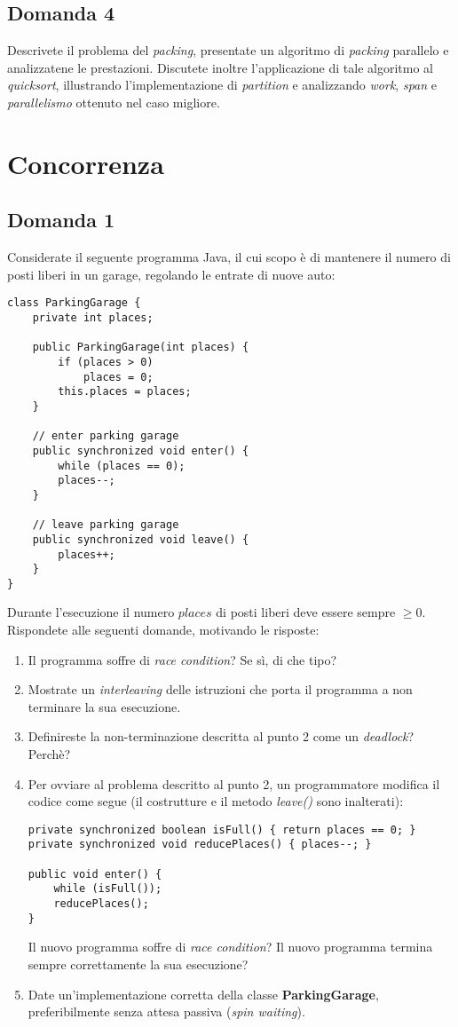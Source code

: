\newpage

\subsection{Domanda 4}
Descrivete il problema del \textit{packing}, presentate un algoritmo di \textit{packing} parallelo e analizzatene le prestazioni. Discutete inoltre l'applicazione di tale algoritmo al \textit{quicksort}, illustrando l'implementazione di \textit{partition} e analizzando \textit{work}, \textit{span} e \textit{parallelismo} ottenuto nel caso migliore.

\newpage

\section{Concorrenza}

\subsection{Domanda 1}
Considerate il seguente programma Java, il cui scopo è di mantenere il numero di posti liberi in un garage, regolando le entrate di nuove auto:
\begin{lstlisting}
class ParkingGarage {
	private int places;

	public ParkingGarage(int places) {
		if (places > 0)
			places = 0;
		this.places = places;
	}

	// enter parking garage
	public synchronized void enter() {
		while (places == 0);
		places--;
	}

	// leave parking garage
	public synchronized void leave() {
		places++;
	}
}
\end{lstlisting}
Durante l'esecuzione il numero $places$ di posti liberi deve essere sempre $\geq 0$. Rispondete alle seguenti domande, motivando le risposte:
\begin{enumerate}
	\item Il programma soffre di \textit{race condition}? Se s\`{i}, di che tipo?
	\item Mostrate un \textit{interleaving} delle istruzioni che porta il programma a non terminare la sua esecuzione.
	\item Definireste la non-terminazione descritta al punto 2 come un \textit{deadlock}? Perch\`{e}?
	\item Per ovviare al problema descritto al punto 2, un programmatore modifica il codice come segue (il costrutture e il metodo \textit{leave()} sono inalterati):
	\begin{lstlisting}
private synchronized boolean isFull() { return places == 0; }
private synchronized void reducePlaces() { places--; }

public void enter() {
	while (isFull());
	reducePlaces();
}
	\end{lstlisting}
	Il nuovo programma soffre di \textit{race condition}? Il nuovo programma termina sempre correttamente la sua esecuzione?
	\item Date un'implementazione corretta della classe \textbf{ParkingGarage}, preferibilmente senza attesa passiva (\textit{spin waiting}).
\end{enumerate}

